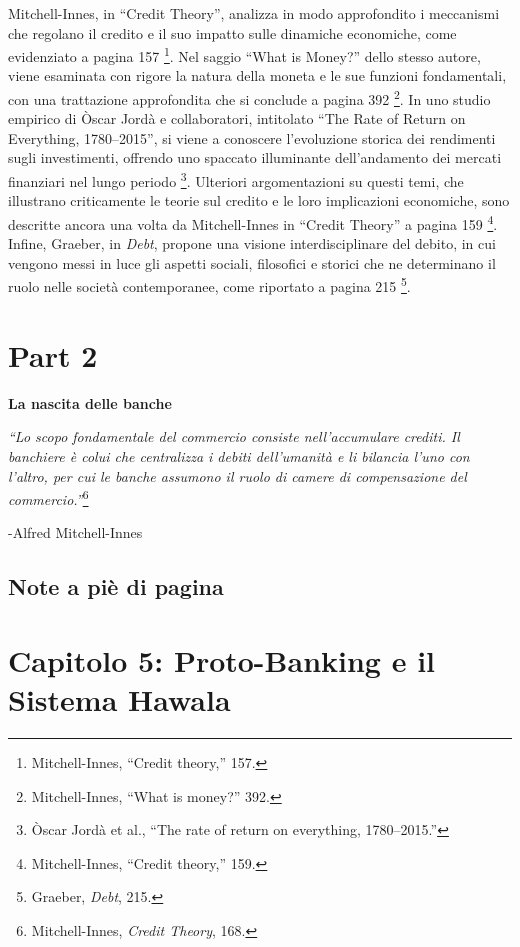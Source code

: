 \documentclass[
  a5paper,
  smalldemyvopaper,10pt,twoside,onecolumn,openright,extrafontsizes,hidelinks]{memoir}
\begin{document}
Mitchell-Innes, in ``Credit Theory'', analizza in modo approfondito i
meccanismi che regolano il credito e il suo impatto sulle dinamiche
economiche, come evidenziato a pagina 157 \footnote{Mitchell-Innes,
  ``Credit theory,'' 157.}. Nel saggio ``What is Money?'' dello stesso
autore, viene esaminata con rigore la natura della moneta e le sue
funzioni fondamentali, con una trattazione approfondita che si conclude
a pagina 392 \footnote{Mitchell-Innes, ``What is money?'' 392.}. In uno
studio empirico di Òscar Jordà e collaboratori, intitolato ``The Rate of
Return on Everything, 1780--2015'', si viene a conoscere l'evoluzione
storica dei rendimenti sugli investimenti, offrendo uno spaccato
illuminante dell'andamento dei mercati finanziari nel lungo periodo
\footnote{Òscar Jordà et al., ``The rate of return on everything,
  1780--2015.''}. Ulteriori argomentazioni su questi temi, che
illustrano criticamente le teorie sul credito e le loro implicazioni
economiche, sono descritte ancora una volta da Mitchell-Innes in
``Credit Theory'' a pagina 159 \footnote{Mitchell-Innes, ``Credit
  theory,'' 159.}. Infine, Graeber, in \emph{Debt}, propone una visione
interdisciplinare del debito, in cui vengono messi in luce gli aspetti
sociali, filosofici e storici che ne determinano il ruolo nelle società
contemporanee, come riportato a pagina 215 \footnote{Graeber,
  \emph{Debt}, 215.}.


\chapter{Part 2}\label{part-2}

\textbf{La nascita delle banche}

\emph{``Lo scopo fondamentale del commercio consiste nell'accumulare
crediti. Il banchiere è colui che centralizza i debiti dell'umanità e li
bilancia l'uno con l'altro, per cui le banche assumono il ruolo di
camere di compensazione del commercio.''}\footnote{Mitchell-Innes,
  \emph{Credit Theory}, 168.}

-Alfred Mitchell-Innes

\section{Note a piè di pagina}\label{note-a-piuxe8-di-pagina-4}


\chapter{\texorpdfstring{Capitolo 5: \textbf{Proto-Banking e il Sistema
Hawala}}{Capitolo 5: Proto-Banking e il Sistema Hawala}}\label{capitolo-5-proto-banking-e-il-sistema-hawala}
\end{document}
